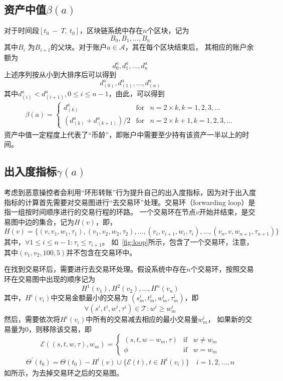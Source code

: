 \subsection{资产中值$\beta(a)$}
对于时间段$[t_0\ −\ T,\ t_0]$，区块链系统中存在$n$个区块，记为
\[
B_0, B_1, \dots, B_n
\]
\noindent 其中$B_{i}$ 为$B_{i+1}$的父块。对于账户$a \in \mathcal{A}$，其在每个区块结束后，
其相应的账户余额为
\[
d^a_0, d^a_1, \dots, d^a_n
\]
上述序列按从小到大排序后可以得到
\[
d^a_{(0)}, d^a_{(1)}, \dots, d^a_{(n)}
\]
其中$d^a_{(i)} < d^a_{(i+1)}, 0\le i \le {n-1}$，由此，可以得到
\begin{align}
\beta(a) = \left\{ \begin{array}{rcl}
{d^a_{(k)}} & \mbox{for} & n=2\times{}k, k=1, 2, 3, \ldots \\
{(d^a_{(k)} + d^a_{(k+1)})/2} & \mbox{for} & n=2\times{}k + 1, k=1, 2, 3, \ldots
\end{array}\right.
\end{align}
资产中值一定程度上代表了“币龄”，即账户中需要至少持有该资产一半以上的时间。

\subsection{出入度指标$\gamma(a)$}
考虑到恶意操控者会利用“环形转账”行为提升自己的出入度指标，因为对于出入度指标的计算首先需要对交易图进行“去交易环”处理。交易环（forwarding loop）是指一组按时间顺序进行的交易行程的环路。
一个交易环在节点$v$开始并结束，是交易图中边的集合，记为$H(v)$，即，
\[
H(v) = \{(v, v_1, w_1, \tau_1), (v_1, v_2, w_2, \tau_2), \dots, (v_i, v_{i+1}, w_{i}, \tau_i), \dots, (v_n, v, w_{n+1}, \tau_{n+1})\}
\]
\noindent 其中，$\forall 1\le i \le {n-1} : \tau_i \le \tau_{i+1} $。
\noindent 如~\ref{fig:loop}所示，包含了一个交易环，注意，其中$(v_1, v_2, 100, 5)$并不包含在交易环中。




在找到交易环后，需要进行去交易环处理。假设系统中存在$n$个交易环，按照交易环在交易图中出现的顺序记为
\[
H^1(v_1), H^2(v_2), \dots, H^n(v_n)\]
\noindent 其中，$H^i(v_i)$中交易金额最小的交易为 $(s^i_m, t^i_m, w^i_m, \tau^i_m)$，即
\[
\forall (s^i, t^i, w^i, \tau^i) \in \mathcal{T} : w^i \ge w^i_m
\]
\noindent 然后，需要依次将$H^i(v_i)$中所有的交易减去相应的最小交易量$w^i_m$，
如果新的交易量为0，则移除该交易，即
\[
\mathcal{E}((s, t, w, \tau), w_m) = \left\{ \begin{array}{rcl}
(s, t, w-w_m, \tau) & \mbox{if} & w \ne w_m \\
\phi & \mbox{if} & w = w_m
\end{array}\right.
\]
\begin{align}
\Theta^{\prime}(t_0)=\Theta(t_0)-H^i(v) \cup \{\mathcal{E}(t), t\in H^i(v_i)\} \quad i = 1, 2,\dots, n
\end{align}
\noindent 如所示，为去掉交易环之后的交易图。


